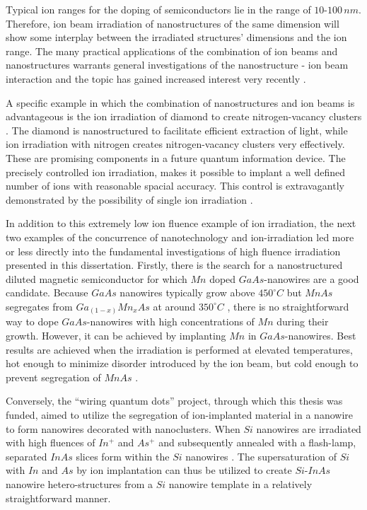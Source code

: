 Typical ion ranges for the doping of semiconductors lie in the range of $10$-$100\,nm$. Therefore, ion beam irradiation of nanostructures of the same dimension will show some interplay between the irradiated structures' dimensions and the ion range. The many practical applications of the combination of ion beams and nanostructures warrants general investigations of the nanostructure - ion beam interaction and the topic has gained increased interest very recently \cite{borschel_ion-solid_2012,greaves_enhanced_2013,nietiadi_sputtering_2014,johannes_ion_2015,urbassek_sputter_2015}.  

A specific example in which the combination of nanostructures and ion beams is advantageous is the ion irradiation of diamond to create nitrogen-vacancy clusters \cite{babinec_diamond_2010}. The diamond is nanostructured to facilitate efficient extraction of light, while ion irradiation with nitrogen creates nitrogen-vacancy clusters very effectively. These are promising components in a future quantum information device. The precisely controlled ion irradiation, makes it possible to implant a well defined number of ions with reasonable spacial accuracy. This control is extravagantly demonstrated by the possibility of single ion irradiation \cite{meijer_concept_2006,ohdomari_single-ion_2008}. 

In addition to this extremely low ion fluence example of ion irradiation, the next two examples of the concurrence of nanotechnology and ion-irradiation led more or less directly into the fundamental investigations of high fluence irradiation presented in this dissertation. Firstly, there is the search for a nanostructured diluted magnetic semiconductor for which $Mn$ doped $GaAs$-nanowires are a good candidate. Because $GaAs$ nanowires typically grow above $450^\circ C$ but $MnAs$ segregates from $Ga_{(1-x)}Mn_xAs$ at around $350^\circ C$ \cite{dietl_engineering_2006,sadowski_gaasmnas_2011}, there is no straightforward way to dope $GaAs$-nanowires with high concentrations of $Mn$ during their growth. However, it can be achieved by implanting $Mn$ in $GaAs$-nanowires. Best results are achieved when the irradiation is performed at elevated temperatures, hot enough to minimize disorder introduced by the ion beam, but cold enough to prevent segregation of $MnAs$ \cite{borschel_new_2011,paschoal_hopping_2012,borschel_ion-solid_2012,kumar_magnetic_2013,paschoal_magnetoresistance_2014}. 

Conversely, the ``wiring quantum dots'' project, through which this thesis was funded, aimed to utilize the segregation of ion-implanted material in a nanowire to form nanowires decorated with nanoclusters. When $Si$ nanowires are irradiated with high fluences of $In^+$ and $As^+$ and subsequently annealed with a flash-lamp, separated $InAs$ slices form within the $Si$ nanowires \cite{prucnal_iii-v_2014,glaser_personal_2015}. The supersaturation of $Si$ with $In$ and $As$ by ion implantation can thus be utilized to create $Si$-$InAs$ nanowire hetero-structures from a $Si$ nanowire template in a relatively straightforward manner.
 
